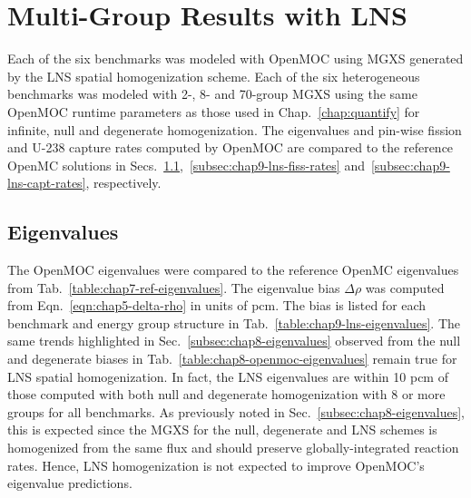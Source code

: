 \section{Multi-Group Results with LNS}
\label{sec:chap9-lns-results}

Each of the six benchmarks was modeled with OpenMOC using \ac{MGXS} generated by the \ac{LNS} spatial homogenization scheme. Each of the six heterogeneous benchmarks was modeled with 2-, 8- and 70-group \ac{MGXS} using the same OpenMOC runtime parameters as those used in Chap.~\ref{chap:quantify} for infinite, null and degenerate homogenization. The eigenvalues and pin-wise fission and U-238 capture rates computed by OpenMOC are compared to the reference OpenMC solutions in Secs.~\ref{subsec:chap9-lns-eigenvalues},~\ref{subsec:chap9-lns-fiss-rates} and~\ref{subsec:chap9-lns-capt-rates}, respectively.

\subsection{Eigenvalues}
\label{subsec:chap9-lns-eigenvalues}

The OpenMOC eigenvalues were compared to the reference OpenMC eigenvalues from Tab.~\ref{table:chap7-ref-eigenvalues}. The eigenvalue bias $\Delta\rho$ was computed from Eqn.~\ref{eqn:chap5-delta-rho} in units of \ac{pcm}. The bias is listed for each benchmark and energy group structure in Tab.~\ref{table:chap9-lns-eigenvalues}. The same trends highlighted in Sec.~\ref{subsec:chap8-eigenvalues} observed from the null and degenerate biases in Tab.~\ref{table:chap8-openmoc-eigenvalues} remain true for \ac{LNS} spatial homogenization. In fact, the \ac{LNS} eigenvalues are within 10 \ac{pcm} of those computed with both null and degenerate homogenization with 8 or more groups for all benchmarks. As previously noted in Sec.~\ref{subsec:chap8-eigenvalues}, this is expected since the \ac{MGXS} for the null, degenerate and \ac{LNS} schemes is homogenized from the same flux and should preserve globally-integrated reaction rates. Hence, \ac{LNS} homogenization is not expected to improve OpenMOC's eigenvalue predictions.

